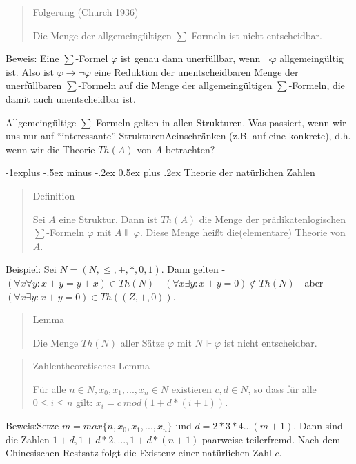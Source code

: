 \documentclass[a4paper]{article}
\makeatletter
\renewcommand{\subsection}{\@startsection{subsection}{2}{0mm}%
                {-1explus -.5ex minus -.2ex}%
                {0.5ex plus .2ex}%
                {\normalfont\normalsize\bfseries}}
\makeatother
\begin{document}
\begin{multicols}{3}
  \begin{quote}
    Folgerung (Church 1936)

    Die Menge der allgemeingültigen $\sum$-Formeln ist nicht entscheidbar.
  \end{quote}

  Beweis: Eine $\sum$-Formel $\varphi$ ist genau dann unerfüllbar, wenn
  $\lnot\varphi$ allgemeingültig ist. Also ist
  $\varphi\rightarrow\lnot\varphi$ eine Reduktion der unentscheidbaren
  Menge der unerfüllbaren $\sum$-Formeln auf die Menge der
  allgemeingültigen $\sum$-Formeln, die damit auch unentscheidbar ist.

  Allgemeingültige $\sum$-Formeln gelten in allen Strukturen. Was
  passiert, wenn wir uns nur auf ``interessante'' StrukturenAeinschränken
  (z.B. auf eine konkrete), d.h. wenn wir die Theorie $Th(A)$ von $A$
  betrachten?

  \subsection{Theorie der natürlichen
    Zahlen}\label{theorie-der-natuxfcrlichen-zahlen}

  \begin{quote}
    Definition

    Sei $A$ eine Struktur. Dann ist $Th(A)$ die Menge der
    prädikatenlogischen $\sum$-Formeln $\varphi$ mit $A\Vdash\varphi$. Diese
    Menge heißt die(elementare) Theorie von $A$.
  \end{quote}

  Beispiel: Sei $N= (N,\leq,+,*, 0 , 1 )$. Dann gelten -
  $(\forall x\forall y:x+y=y+x)\in Th(N)$ -
  $(\forall x\exists y:x+y= 0 )\not\in Th(N)$ - aber
  $(\forall x\exists y:x+y= 0 )\in Th((Z,+, 0 ))$.

  \begin{quote}
    Lemma

    Die Menge $Th(N)$ aller Sätze $\varphi$ mit $N\Vdash\varphi$ ist nicht
    entscheidbar.
  \end{quote}

  \begin{quote}
    Zahlentheoretisches Lemma

    Für alle $n\in N,x_0,x_1,...,x_n\in N$ existieren $c,d\in N$, so dass
    für alle $0\leq i\leq n$ gilt: $x_i=c\ mod ( 1 +d*(i+ 1 ))$.
  \end{quote}

  Beweis:Setze $m= max\{n,x_0,x_1 ,...,x_n\}$ und $d=2*3*4...(m+1)$. Dann
  sind die Zahlen $1+d, 1+d*2,..., 1 +d*(n+1)$ paarweise teilerfremd. Nach
  dem Chinesischen Restsatz folgt die Existenz einer natürlichen Zahl $c$.


\end{multicols}
\end{document}
